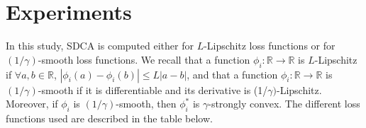 \documentclass{article}
\newcommand{\abs}[1]{\left|#1\right|}
\begin{document}
\section{Experiments}

In this study, SDCA is computed either for $L$-Lipschitz loss functions or for $(1/\gamma)$-smooth loss functions.
We recall that a function $\phi_i : \mathbb{R} \rightarrow \mathbb{R}$ is $L$-Lipschitz if $\forall a,b \in \mathbb{R}$, $\abs{\phi_i(a)-\phi_i(b)} \leq L \abs{a-b}$, and that a function $\phi_i : \mathbb{R} \rightarrow \mathbb{R}$ is $(1/\gamma)$-smooth if it is differentiable and its derivative is (1/$\gamma)$-Lipschitz.
Moreover, if $\phi_i$ is $(1/\gamma)$-smooth, then $\phi_i^{*}$ is $\gamma$-strongly convex.
The different loss functions used are described in the table below.
\end{document}
